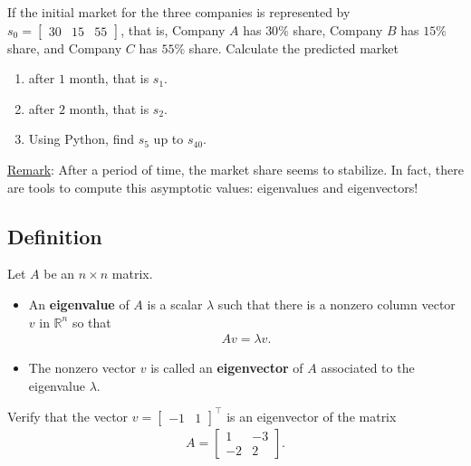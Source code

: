 \documentclass[12pt,a4paper]{article}
\newcounter{example}[section]
\begin{document}
	\begin{example}
	If the initial market for the three companies is represented by $s_0 = \begin{bmatrix} 30 & 15 & 55 \end{bmatrix}$, that is, Company $A$ has $30\%$ share, Company $B$ has $15\%$ share, and Company $C$ has $55\%$ share. Calculate the predicted market 
		\begin{enumerate}
		\item after $1$ month, that is $s_1$.
		\item after $2$ month, that is $s_2$.
		\item Using Python, find $s_5$ up to $s_{40}$.
		\end{enumerate}
	\end{example}

	\vfill
	
	\underline{Remark}: After a period of time, the market share seems to stabilize. In fact, there are tools to compute this asymptotic values: eigenvalues and eigenvectors!
	
	\newpage
	
	\subsection{Definition}
	Let $A$ be an $n \times n$ matrix.
		
		\begin{itemize}
		\item An \textbf{eigenvalue} of $A$ is a scalar $\lambda$ such that there is a nonzero column vector $v$ in $\mathbb{R}^n$ so that
			\begin{align*}
			Av = \lambda v .
			\end{align*}
		\item The nonzero vector $v$ is called an \textbf{eigenvector} of $A$ associated to the eigenvalue $\lambda$.
		\end{itemize}
		
	\begin{example}
	Verify that the vector $v = \begin{bmatrix} -1 & 1 \end{bmatrix}^\top$ is an eigenvector of the matrix
		\begin{align*}
		A = \begin{bmatrix}
		1 & -3 \\ -2 & 2 
		\end{bmatrix} .
		\end{align*}
	\end{example}
	
\end{document}
